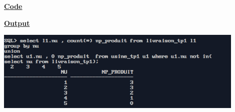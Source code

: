 \newpage
{}

\textbf{\underline{Code}}


\vspace{1cm}
\textbf{\underline{Output}}
\vspace{1cm}
\begin{center}
    \includegraphics[width=0.9\textwidth]{Questions/q38/q38.png}
\end{center}


